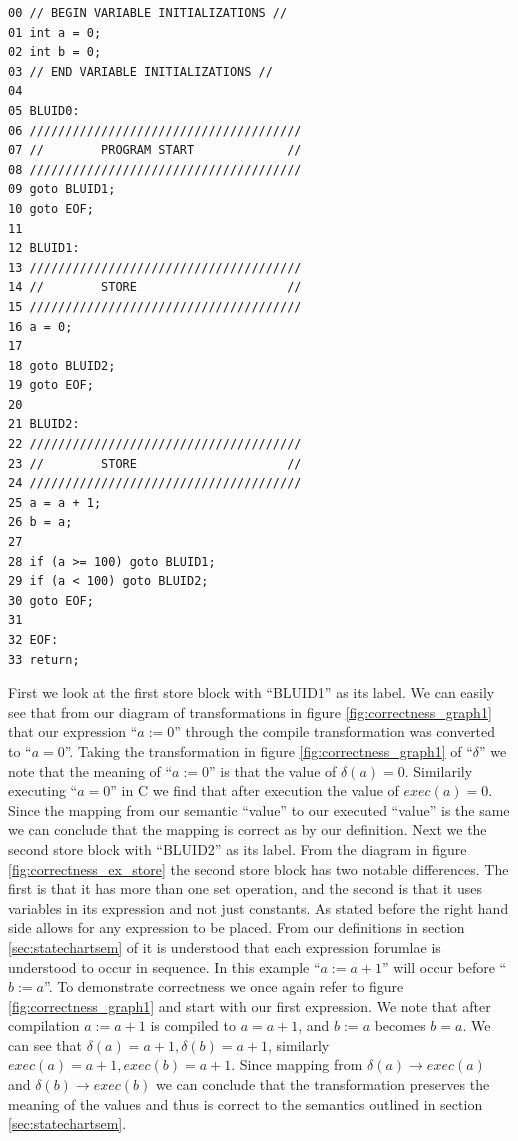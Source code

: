\begin{minipage}{\textwidth}
\begin{lstlisting}[frame=single]
00 // BEGIN VARIABLE INITIALIZATIONS //
01 int a = 0;
02 int b = 0;
03 // END VARIABLE INITIALIZATIONS //
04
05 BLUID0:
06 //////////////////////////////////////
07 //        PROGRAM START             //
08 //////////////////////////////////////
09 goto BLUID1;
10 goto EOF;
11
12 BLUID1:
13 //////////////////////////////////////
14 //        STORE                     //
15 //////////////////////////////////////
16 a = 0;
17 
18 goto BLUID2;
19 goto EOF;
20
21 BLUID2:
22 //////////////////////////////////////
23 //        STORE                     //
24 //////////////////////////////////////
25 a = a + 1;
26 b = a;
27
28 if (a >= 100) goto BLUID1;
29 if (a < 100) goto BLUID2;
30 goto EOF;
31
32 EOF:
33 return;
\end{lstlisting}
\end{minipage}

First we look at the first store block with ``BLUID1'' as its label. We can easily see that from our diagram
of transformations in figure \ref{fig:correctness_graph1} that our expression ``$a := 0$'' through the compile
transformation was converted to ``$a = 0$''. Taking the transformation in figure \ref{fig:correctness_graph1}
of ``$\delta$'' we note that the meaning of ``$a := 0$'' is that the value of $\delta(a) = 0$. Similarily
executing ``$a = 0$'' in C we find that after execution the value of $exec(a) = 0$. Since the mapping from
our semantic ``value'' to our executed ``value'' is the same we can conclude that the mapping is correct as
by our definition. Next we the second store block with ``BLUID2'' as its label. From the diagram in figure
\ref{fig:correctness_ex_store} the second store block has two notable differences. The first is that it has
more than one set operation, and the second is that it uses variables in its expression and not just constants.
As stated before the right hand side allows for any expression to be placed. From our definitions in
section \ref{sec:statechartsem} of \plcchart it is understood that each expression forumlae is understood
to occur in sequence. In this example ``$a := a + 1$'' will occur before ``$b := a$''. To demonstrate
correctness we once again refer to figure \ref{fig:correctness_graph1} and start with our first expression.
We note that after compilation $a := a + 1$ is compiled to $a = a + 1$, and $b := a$ becomes $b = a$. We
can see that $\delta(a) = a + 1, \delta(b) = a + 1$, similarly $exec(a) = a + 1, exec(b) = a + 1$. Since
mapping from $\delta(a) \rightarrow exec(a)$ and $\delta(b) \rightarrow exec(b)$ we can conclude that the
transformation preserves the meaning of the values and thus is correct to the semantics outlined in
section \ref{sec:statechartsem}.

